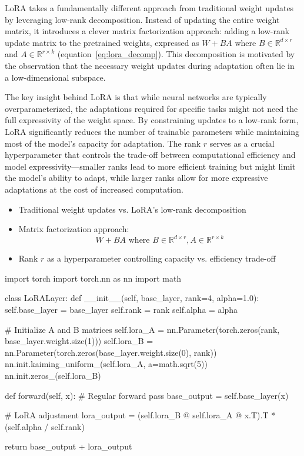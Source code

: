 \noindent
LoRA takes a fundamentally different approach from traditional weight updates by leveraging low-rank decomposition. Instead of updating the entire weight matrix, it introduces a clever matrix factorization approach: adding a low-rank update matrix to the pretrained weights, expressed as $W + BA$ where $B \in \mathbb{R}^{d \times r}$ and $A \in \mathbb{R}^{r \times k}$ (equation~\ref{eq:lora_decomp}). This decomposition is motivated by the observation that the necessary weight updates during adaptation often lie in a low-dimensional subspace.

The key insight behind LoRA is that while neural networks are typically overparameterized, the adaptations required for specific tasks might not need the full expressivity of the weight space. By constraining updates to a low-rank form, LoRA significantly reduces the number of trainable parameters while maintaining most of the model's capacity for adaptation. The rank $r$ serves as a crucial hyperparameter that controls the trade-off between computational efficiency and model expressivity—smaller ranks lead to more efficient training but might limit the model's ability to adapt, while larger ranks allow for more expressive adaptations at the cost of increased computation.

\begin{itemize}
    \item Traditional weight updates vs. LoRA's low-rank decomposition
    \item Matrix factorization approach: 
    \begin{equation}\label{eq:lora_decomp}
    W + BA \text{ where } B \in \mathbb{R}^{d \times r}, A \in \mathbb{R}^{r \times k}
    \end{equation}
    \item Rank $r$ as a hyperparameter controlling capacity vs. efficiency trade-off
\end{itemize}

\begin{pythoncode}
import torch
import torch.nn as nn
import math

class LoRALayer:
    def __init__(self, base_layer, rank=4, alpha=1.0):
        self.base_layer = base_layer
        self.rank = rank
        self.alpha = alpha
        
        # Initialize A and B matrices
        self.lora_A = nn.Parameter(torch.zeros(rank, base_layer.weight.size(1)))
        self.lora_B = nn.Parameter(torch.zeros(base_layer.weight.size(0), rank))
        nn.init.kaiming_uniform_(self.lora_A, a=math.sqrt(5))
        nn.init.zeros_(self.lora_B)
        
    def forward(self, x):
        # Regular forward pass
        base_output = self.base_layer(x)
        
        # LoRA adjustment
        lora_output = (self.lora_B @ self.lora_A @ x.T).T * (self.alpha / self.rank)
        
        return base_output + lora_output
\end{pythoncode}

